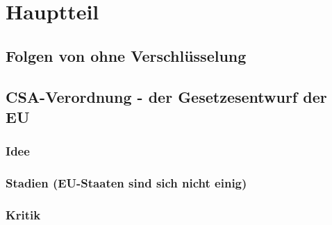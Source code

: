 \chapter{Hauptteil} %

\section{Folgen von \glqq ohne Verschlüsselung\grqq{}}

\section{CSA-Verordnung - der Gesetzesentwurf der EU}
\subsection{Idee}
\subsection{Stadien (EU-Staaten sind sich nicht einig)}
\subsection{Kritik}
